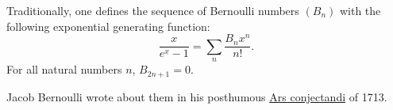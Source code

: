 \documentclass [preview, border = 20pt] {standalone}
\begin{document}
\pagecolor{black}
\color{white}
Traditionally, one defines the sequence of Bernoulli numbers $(B_n)$ with the following exponential generating function:
\[
  \frac{x}{e^x-1} = \sum_n \frac{B_n x^n}{n!}.
\]
For all natural numbers $n$, $B_{2n+1} = 0$. 

Jacob Bernoulli wrote about them in his posthumous \ul{Ars conjectandi} of 1713.
\end{document}
